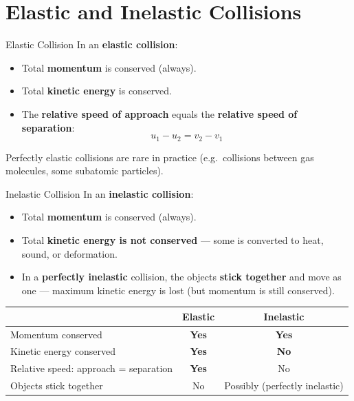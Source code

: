 \section{Elastic and Inelastic Collisions}

\begin{definitionbox}{Elastic Collision}
In an \textbf{elastic collision}:
\begin{itemize}[itemsep=2pt]
  \item Total \textbf{momentum} is conserved (always).
  \item Total \textbf{kinetic energy} is conserved.
  \item The \textbf{relative speed of approach} equals the \textbf{relative speed of separation}:
  $$u_1 - u_2 = v_2 - v_1$$
\end{itemize}
Perfectly elastic collisions are rare in practice (e.g.\ collisions between gas molecules, some subatomic particles).
\end{definitionbox}

\begin{definitionbox}{Inelastic Collision}
In an \textbf{inelastic collision}:
\begin{itemize}[itemsep=2pt]
  \item Total \textbf{momentum} is conserved (always).
  \item Total \textbf{kinetic energy is not conserved} — some is converted to heat, sound, or deformation.
  \item In a \textbf{perfectly inelastic} collision, the objects \textbf{stick together} and move as one — maximum kinetic energy is lost (but momentum is still conserved).
\end{itemize}
\end{definitionbox}

\begin{center}
\renewcommand{\arraystretch}{1.5}
\begin{tabular}{@{} l c c @{}}
\toprule
 & \textbf{Elastic} & \textbf{Inelastic} \\
\midrule
Momentum conserved & \textbf{Yes} & \textbf{Yes} \\
Kinetic energy conserved & \textbf{Yes} & \textbf{No} \\
Relative speed: approach = separation & \textbf{Yes} & No \\
Objects stick together & No & Possibly (perfectly inelastic) \\
\bottomrule
\end{tabular}
\end{center}





